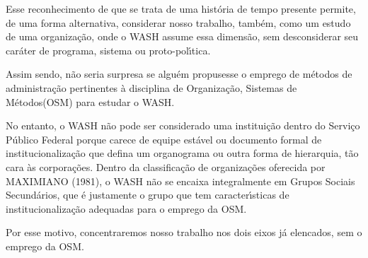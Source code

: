 \documentclass[
12pt,		%
openright,	%
twoside,  %
a4paper,			%
chapter=TITLE,		%
english,			%
french,				%
spanish,			%
brazil				%
]{USPSC-classe/USPSC}
\begin{document}
Esse reconhecimento de que se trata de uma hist\'oria de tempo presente permite, de uma forma alternativa, considerar nosso trabalho, tamb\'em, como um estudo de uma organiza\c{c}\~ao, onde o WASH assume essa dimens\~ao, sem desconsiderar seu car\'ater de  programa, sistema ou proto-pol\'{\i}tica.










Assim sendo, n\~ao seria surpresa se algu\'em propusesse o emprego de m\'etodos de administra\c{c}\~ao pertinentes \`a disciplina de \textquotedbl Organiza\c{c}\~ao, Sistemas de M\'etodos\textquotedbl  (OSM) para estudar o WASH.











\noindent\begin{center}\mbox{\centering{}}\end{center}


No entanto, o WASH n\~ao pode ser considerado uma institui\c{c}\~ao dentro do Servi\c{c}o P\'ublico Federal porque carece de equipe est\'avel ou documento formal de institucionaliza\c{c}\~ao que defina um organograma ou outra forma de hierarquia, t\~ao cara \`as corpora\c{c}\~oes. Dentro da classifica\c{c}\~ao de organiza\c{c}\~oes oferecida por MAXIMIANO (1981), o WASH n\~ao se encaixa integralmente em \textquotedbl Grupos Sociais Secund\'arios\textquotedbl , que \'e justamente o grupo que tem caracter\'{\i}sticas de institucionaliza\c{c}\~ao adequadas para o emprego da OSM.










Por esse motivo, concentraremos nosso trabalho nos dois eixos j\'a elencados, sem o emprego da OSM.
\end{document}
